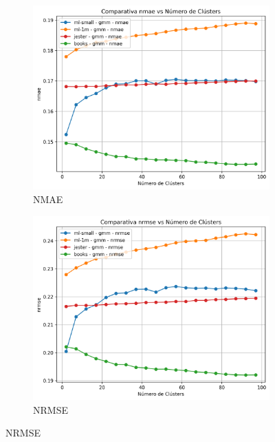 \documentclass[a4paper,12pt]{report}
\begin{document}
\begin{figure}[H]
    \centering
    \begin{subfigure}[b]{0.49\textwidth}
        \includegraphics[width=\textwidth]{Figuras/nmae-gmm-all.png}
        \caption{NMAE}
        \label{fig:gmm-clustering-results-a}
    \end{subfigure}
    \hfill
    \begin{subfigure}[b]{0.49\textwidth}
        \includegraphics[width=\textwidth]{Figuras/nrmse-gmm-all.png}
        \caption{NRMSE}
        \label{fig:gmm-clustering-results-b}
    \end{subfigure}


\end{figure}
\end{document}
